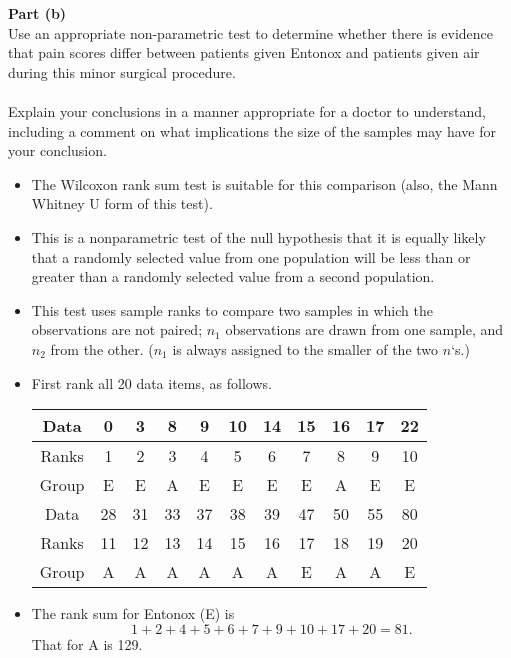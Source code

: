 \documentclass[a4paper,12pt]{article}
\begin{document}
\newpage
\begin{framed}
\large
\noindent \textbf{Part (b)} \\ \large \noindent  Use an appropriate non-parametric test to determine whether there is evidence that pain scores differ between patients given Entonox and patients given air during this minor surgical procedure. \\ \\ \large Explain your conclusions in a manner appropriate for a doctor to understand, including a comment on what implications the size of the samples may have for your conclusion. 
\end{framed}
\large 
\begin{itemize} 
\item The Wilcoxon rank sum test is suitable for this comparison (also, the Mann Whitney U form of this test).  
\item This is a nonparametric test of the null hypothesis that it is equally likely that a randomly selected value from one population will be less than or greater than a randomly selected value from a second population.
\item This test uses sample ranks to compare two samples in which the observations are not paired; $n_1$ observations are drawn from one sample, and $n_2$ from the other. ($n_1$ is always assigned to the smaller of the two $n$‘s.)
\item First rank all 20 data items, as follows. 
\begin{center}
\begin{tabular}{|c||c|c|c|c|c|c|c|c|c|c|}\hline
Data & 0 & 3 & 8 & 9 & 10&  14&  15&  16&  17&  22\\ \hline

Ranks & 1 & 2 & 3 & 4 & 5 & 6 & 7 & 8 & 9 & 10\\ \hline
Group &  E&  E&  A&  E & E&  E&  E&  A&  E&  E\\ \hline \hline
 
Data & 28&  31&  33&  37&  38 & 39&  47&  50&  55 & 80\\ \hline
Ranks & 11&  12&  13&  14&  15&  16&  17 & 18 & 19&  20\\ \hline 
Group& A& A& A& A&  A &A &E &A &A &E\\ \hline
\end{tabular}
 
 \end{center}
\item The rank sum for Entonox (E) is \[1 + 2 + 4 + 5 + 6 + 7 + 9 + 10 + 17 + 20 = 81. \] That for A is 129. 
 


\end{itemize}
\end{document}
